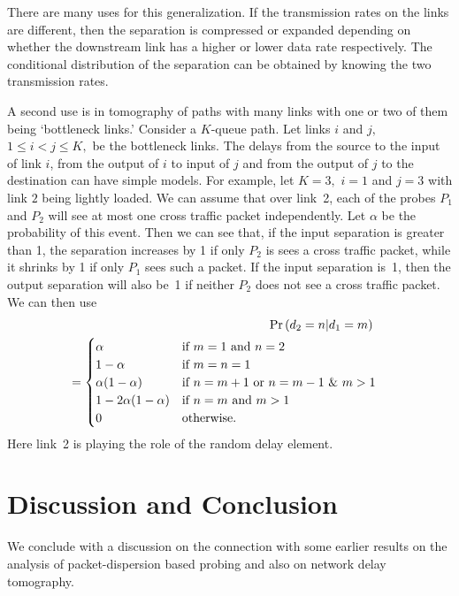 \documentclass[11pt]{article}
\newcommand{\prob}[1]{\mathsf{\Pr}\left(#1\right)}
\begin{document}
There are many uses for this generalization. If the transmission rates
on the links are different, then the separation is compressed or
expanded depending on whether the downstream link has a higher or
lower data rate respectively. The conditional distribution of the
separation can be obtained by knowing the two transmission rates.

A second use is in tomography of paths with many links with one or two
of them being `bottleneck links.' Consider a $K$-queue path.  Let
links $i$ and $j,$ $1 \leq i < j \leq K,$ be the bottleneck links.
The delays from the source to the input of link $i$, from the output
of $i$ to input of $j$ and from the output of $j$ to the destination
can have simple models. For example, let $K=3,$ $i=1$ and $j=3$ with
link $2$ being lightly loaded. We can assume that over link~2, each of
the probes $P_1$ and $P_2$ will see at most one cross traffic packet
independently. Let $\alpha$ be the probability of this event. Then we
can see that, if the input separation is greater than 1, the
separation increases by 1 if only $P_2$ is sees a cross traffic
packet, while it shrinks by 1 if only $P_1$ sees such a packet. If the
input separation is~1, then the output separation will also be~1 if
neither $P_2$ does not see a cross traffic packet. We can then use
\begin{eqnarray*}
  && \hspace{-0.25in}\prob{d_2=n|d_1=m} \  \\
  && \hspace{-0.25in}=
  \begin{cases}
    \alpha & \mbox{if $m=1$ and $n =2 $} \\ 
    1-\alpha & \mbox{if $m=n=1$} \\ 
    \alpha(1-\alpha) & \mbox{if $n = m+1$ or $n=m-1$ \& $m>1$} \\
    1-2\alpha(1-\alpha) & \mbox{if $n=m$ and $m > 1$} \\ 
    0 & \mbox{otherwise}.
  \end{cases}
\end{eqnarray*}
Here link~2 is playing the role of the random delay element. 

\section{Discussion and Conclusion}
\label{sec:discussion}
We conclude with a discussion on the connection with some earlier
results on the analysis of packet-dispersion based probing and also on
network delay tomography.
\end{document}
